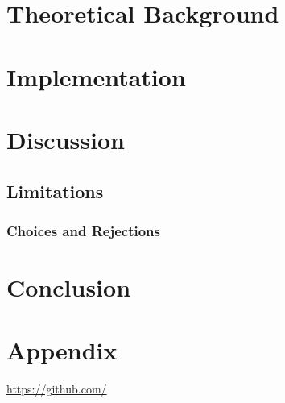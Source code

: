 \documentclass[12pt,a4paper]{article}
\begin{document}
\section{Theoretical Background}
\label{theoretical_Background}



\clearpage

\section{Implementation}
\label{implementation}



\clearpage
\section{Discussion}
\label{discussion}

\subsection{Limitations}
\label{limitations}


\subsubsection{Choices and Rejections}

\clearpage

\section{Conclusion}
\label{sec:conclusion}


\clearpage
\section{Appendix}
\url{https://github.com/}
\clearpage


\end{document}
